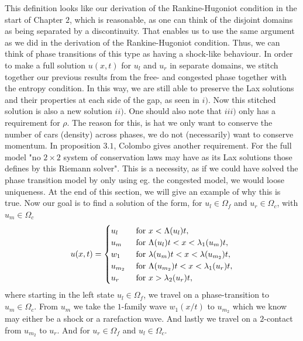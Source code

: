 \documentclass[10pt]{article}
\numberwithin{equation}{section}
\begin{document}
This definition looks like our derivation of the Rankine-Hugoniot condition in the start of Chapter $2$, which is reasonable, as one can think of the disjoint domains as being separated by a discontinuity. That enables us to use the same argument as we did in the derivation of the Rankine-Hugoniot condition. Thus, we can think of phase transitions of this type as having a shock-like behaviour. In order to make a full solution $u(x,t)$ for $u_l$ and $u_r$ in separate domains, we stitch together our previous results from the free- and congested phase together with the entropy condition. In this way, we are still able to preserve the Lax solutions and their properties at each side of the gap, as seen in $i)$. Now this stitched solution is also a new solution $ii)$. One should also note that $iii)$ only has a requirement for $\rho$. The reason for this, is hat we only want to conserve the number of cars (density) across phases, we do not (necessarily) want to conserve momentum. In proposition $3.1$, Colombo gives another requirement. For the full model "no $2 \times 2$ system of conservation laws may have as its Lax solutions those defines by this Riemann solver"\cite[p.~713]{Colombo2003}. This is a necessity, as if we could have solved the phase transition model by only using eg. the congested model, we would loose uniqueness. At the end of this section, we will give an example of why this is true.
Now our goal is to find a solution of the form, for $u_l \in \Omega_f$ and $u_r \in \Omega_c$, with $u_m \in \Omega_c$
\begin{align}
    u(x,t) = \begin{cases}
        u_l & \text{ for $ x < \Lambda(u_l)t$}, \\
        u_{m} & \text{ for $ \Lambda(u_l)t < x < \lambda_1(u_{m})t$}, \\
        w_1 & \text{ for $\lambda(u_{m})t < x < \lambda(u_{m_2})t $}, \\
        u_{m_2} & \text{ for $ \Lambda(u_{m_2})t < x < \lambda_1(u_{r})t$}, \\
        u_r & \text{ for $x > \lambda_2( u_r)t$},
    \end{cases}
    \label{Eq:APrioriFreeToCong}
\end{align}
where starting in the left state $u_l \in \Omega_f$, we travel on a phase-transition to $u_m \in \Omega_c$. From $u_m$ we take the $1$-family wave $w_1(x/t)$ to $u_{m_2}$ which we know may either be a shock or a rarefaction wave. And lastly we travel on a $2$-contact from $u_{m_2}$ to $u_r$. And for $u_r \in \Omega_f$ and $u_l \in \Omega_c$.
\end{document}
